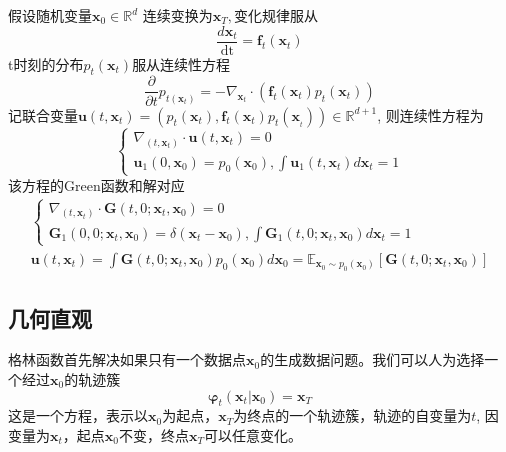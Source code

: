 \documentclass{article}
\newcommand{\nobracket}{}
\newcommand{\tmmathbf}[1]{\ensuremath{\boldsymbol{#1}}}
\newcommand{\tmop}[1]{\ensuremath{\operatorname{#1}}}
\begin{document}
\begin{CJK*}{UTF8}{gbsn}
假设随机变量$\tmmathbf{x}_0 \in \mathbb{R}^d$
连续变换为$\tmmathbf{x}_T,$变化规律服从
\[ \frac{d\tmmathbf{x}_t}{\tmop{dt}} =\tmmathbf{f}_t (\tmmathbf{x}_t) \]
t时刻的分布$p_t (\tmmathbf{x}_t)$服从连续性方程
\[ \frac{\partial}{\partial t} p_{t (\tmmathbf{x}_t)} = -
   \nabla_{\tmmathbf{x}_t} \cdot (\tmmathbf{f}_t (\tmmathbf{x}_t) p_t
   (\tmmathbf{x}_t)) \]
记联合变量$\tmmathbf{u} (t, \tmmathbf{x}_t) = (p_t (\tmmathbf{x}_t),
\tmmathbf{f}_t (\tmmathbf{x}_t) p_t (\tmmathbf{x}_{_t})) \in \mathbb{R}^{d +
1}$, 则连续性方程为
\[ \left\{ \begin{array}{c}
     \nabla_{(t, \tmmathbf{x}_t)} \cdot \tmmathbf{u} (t, \tmmathbf{x}_t) = 0\\
     \tmmathbf{u}_1 (0, \tmmathbf{x}_0) = p_0 (\tmmathbf{x}_0), \int 
     \tmmathbf{u}_1 (t, \tmmathbf{x}_t) d\tmmathbf{x}_t = 1
   \end{array} \right. \]
该方程的Green函数和解对应
\[ \begin{array}{l}
     \left\{ \begin{array}{l}
       \nabla_{(t, \tmmathbf{x}_t)} \cdot \tmmathbf{G} (t, 0 ; \tmmathbf{x}_t,
       \tmmathbf{x}_0) = 0\\
       \tmmathbf{G}_1 (0, 0 ; \tmmathbf{x}_t, \tmmathbf{x}_0) = \delta
       (\tmmathbf{x}_t -\tmmathbf{x}_0), \int \tmmathbf{G}_1 (t, 0 ;
       \tmmathbf{x}_t, \tmmathbf{x}_0) d\tmmathbf{x}_t = 1
     \end{array} \right.\\
     \tmmathbf{u} (t, \tmmathbf{x}_t) = \int \tmmathbf{G} (t, 0 ;
     \tmmathbf{x}_t, \tmmathbf{x}_0) p_0 (\tmmathbf{x}_0) d\tmmathbf{x}_0
     =\mathbb{E}_{\tmmathbf{x}_0 \sim p_0 (\tmmathbf{x}_0)} [\tmmathbf{G} (t,
     0 ; \tmmathbf{x}_t, \tmmathbf{x}_0)]
   \end{array} \]


\subsection{几何直观}

格林函数首先解决如果只有一个数据点$\tmmathbf{x}_0$的生成数据问题。我们可以人为选择一个经过$\tmmathbf{x}_0$的轨迹簇
\[ \tmmathbf{\varphi}_t (\tmmathbf{x}_t | \tmmathbf{x}_0 \nobracket)
   =\tmmathbf{x}_T \]
这是一个方程，表示以$\tmmathbf{x}_0$为起点，$\tmmathbf{x}_T$为终点的一个轨迹簇，轨迹的自变量为$t$,
因变量为$\tmmathbf{x}_t$，起点$\tmmathbf{x}_0$不变，终点$\tmmathbf{x}_T$可以任意变化。


\end{CJK*}
\end{document}
